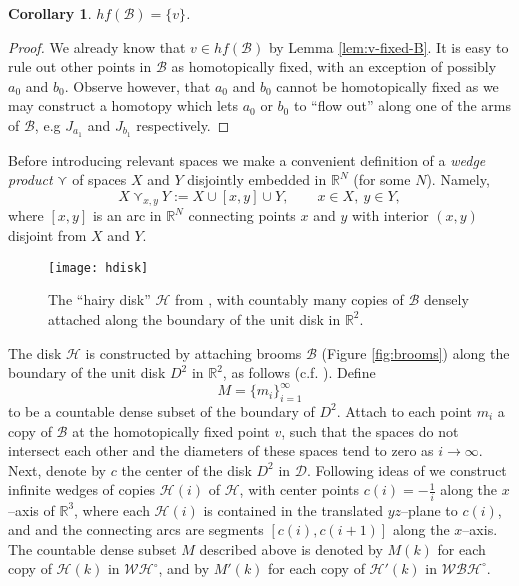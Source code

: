 \documentclass[reqno,12pt]{amsart}
\newtheorem{corollary}[theorem]{Corollary}
\theoremstyle{ourremark}
\numberwithin{equation}{section}
\numberwithin{theorem}{section}
\begin{document}
\begin{corollary}\label{lem:hf(B)}
 $hf(\mathcal{B})=\{v\}$.
\end{corollary}
\begin{proof}
 We already know that $v\in hf(\mathcal{B})$ by Lemma \ref{lem:v-fixed-B}. It is easy to rule out other points in $\mathcal{B}$ as homotopically fixed, with an exception of possibly $a_0$ and $b_0$. Observe however, that $a_0$ and $b_0$ cannot be homotopically fixed as we may construct a homotopy which lets $a_0$ or $b_0$ to ``flow out'' along one of the arms of $\mathcal{B}$, e.g $J_{a_1}$ and  $J_{b_1}$ respectively.
\end{proof}
 Before introducing relevant spaces we make a convenient definition of a {\em wedge product} $\curlyvee$ of spaces $X$ and $Y$ disjointly embedded in ${\mathbb{R}}^N$ (for some $N$). Namely, 
\[
 X\curlyvee_{x,y} Y:= X\cup [x,y]\cup Y,\qquad x\in X,\ y\in Y,
\]
where $[x,y]$ is an arc in ${\mathbb{R}}^N$ connecting points $x$ and $y$ with interior $(x,y)$ disjoint from $X$ and $Y$. 
\begin{figure}[!ht] 
  \centering
   \texttt{[image: hdisk]} \qquad
  \caption{The ``hairy disk'' $\mathcal{H}$ from \cite[p. 286]{Karimov-Repovs-Rosicki-Zastrow05}, with countably many copies of $\mathcal{B}$ densely attached along the boundary of the unit disk in ${\mathbb{R}}^2$.} \label{fig:hairy-disk} 
\end{figure} 
The disk $\mathcal{H}$ is constructed by attaching brooms $\mathcal{B}$ (Figure \ref{fig:brooms}) along the boundary of the unit disk $D^2$ in ${\mathbb{R}}^2$, as follows (c.f. \cite{Karimov-Repovs-Rosicki-Zastrow05}).  Define 
\begin{equation}\label{eq:M-def}
M =\{m_i\}^{\infty}_{i=1}
\end{equation}
to be a countable dense subset of the boundary of $D^2$. Attach to each
point $m_i$ a copy of $\mathcal{B}$ at the homotopically fixed point $v$, such that the spaces do not intersect each
other and the diameters of these spaces tend to zero as $i\to\infty$. Next, denote by $c$ the center of the disk $D^2$ in $\mathcal{D}$. Following ideas of \cite{Stewart58} we construct infinite wedges of copies $\mathcal{H}(i)$ of $\mathcal{H}$, with center points $c(i)=-\frac{1}{i}$ along the $x$--axis of ${\mathbb{R}}^3$, where each $\mathcal{H}(i)$ is contained in the translated $yz$--plane to $c(i)$, and  and the connecting arcs are segments $[c(i),c(i+1)]$ along the $x$--axis. The countable dense subset $M$ described above is denoted by $M(k)$ for each copy of $\mathcal{H}(k)$ in $\mathcal{WH}^\circ$, and by $M'(k)$ for each copy of $\mathcal{H}'(k)$ in $\mathcal{WBH}^\circ$.
\end{document}
